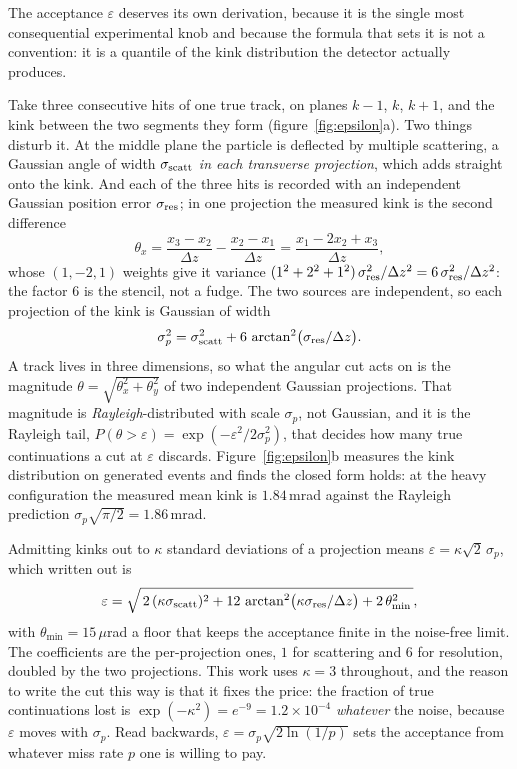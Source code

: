 \documentclass[11pt,a4paper]{article}
\begin{document}
The acceptance $\varepsilon$ deserves its own derivation, because it is
the single most consequential experimental knob and because the formula
that sets it is not a convention: it is a quantile of the kink
distribution the detector actually produces.

Take three consecutive hits of one true track, on planes $k{-}1$, $k$,
$k{+}1$, and the kink between the two segments they form
(figure~\ref{fig:epsilon}a). Two things disturb it. At the middle plane
the particle is deflected by multiple scattering, a Gaussian angle of
width $\sigma_{\rm scatt}$ \emph{in each transverse projection}, which
adds straight onto the kink. And each of the three hits is recorded with
an independent Gaussian position error $\sigma_{\rm res}$; in one
projection the measured kink is the second difference
\[
\theta_x=\frac{x_3-x_2}{\Delta z}-\frac{x_2-x_1}{\Delta z}
        =\frac{x_1-2x_2+x_3}{\Delta z},
\]
whose $(1,-2,1)$ weights give it variance
$(1^2+2^2+1^2)\,\sigma_{\rm res}^{2}/\Delta z^{2}
=6\,\sigma_{\rm res}^{2}/\Delta z^{2}$: the factor $6$ is the stencil,
not a fudge. The two sources are independent, so each projection of the
kink is Gaussian of width
\[
\sigma_p^{2}=\sigma_{\rm scatt}^{2}
+6\,\arctan^{2}\!\big(\sigma_{\rm res}/\Delta z\big).
\]
A track lives in three dimensions, so what the angular cut acts on is
the magnitude $\theta=\sqrt{\theta_x^{2}+\theta_y^{2}}$ of two
independent Gaussian projections. That magnitude is
\emph{Rayleigh}-distributed with scale $\sigma_p$, not Gaussian, and it
is the Rayleigh tail, $P(\theta>\varepsilon)
=\exp(-\varepsilon^{2}/2\sigma_p^{2})$, that decides how many true
continuations a cut at $\varepsilon$ discards.
Figure~\ref{fig:epsilon}b measures the kink distribution on generated
events and finds the closed form holds: at the heavy configuration the
measured mean kink is $1.84$\,mrad against the Rayleigh prediction
$\sigma_p\sqrt{\pi/2}=1.86$\,mrad.

Admitting kinks out to $\kappa$ standard deviations of a projection
means $\varepsilon=\kappa\sqrt2\,\sigma_p$, which written out is
\begin{equation}
\varepsilon=\sqrt{\,2\,(\kappa\sigma_{\rm scatt})^{2}
+12\,\arctan^{2}\!\big(\kappa\sigma_{\rm res}/\Delta z\big)
+2\,\theta_{\min}^{2}\,},
\label{eq:epsilon}
\end{equation}
with $\theta_{\min}=15\,\mu$rad a floor that keeps the acceptance finite
in the noise-free limit. The coefficients are the per-projection ones,
$1$ for scattering and $6$ for resolution, doubled by the two
projections. This work uses $\kappa=3$ throughout, and the reason to
write the cut this way is that it fixes the price: the fraction of true
continuations lost is $\exp(-\kappa^{2})=e^{-9}=1.2\times10^{-4}$
\emph{whatever} the noise, because $\varepsilon$ moves with $\sigma_p$.
Read backwards, $\varepsilon=\sigma_p\sqrt{2\ln(1/p)}$ sets the
acceptance from whatever miss rate $p$ one is willing to pay.
\end{document}
